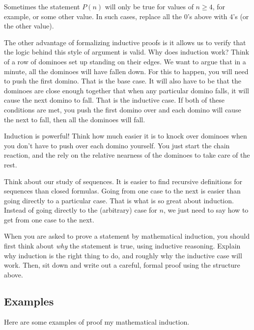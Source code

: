 \documentclass[12pt]{article}
\begin{document}
Sometimes the statement $P(n)$ will only be true for values of $n \ge 4$, for example, or some other value.  In such cases, replace all the 0's above with 4's (or the other value).

The other advantage of formalizing inductive proofs is it allows us to verify that the logic behind this style of argument is valid.  Why does induction work?  Think of a row of dominoes set up standing on their edges.  We want to argue that in a minute, all the dominoes will have fallen down.  For this to happen, you will need to push the first domino.  That is the base case.  It will also have to be that the dominoes are close enough together that when any particular domino falls, it will cause the next domino to fall.  That is the inductive case.  If both of these conditions are met, you push the first domino over and each domino will cause the next to fall, then all the dominoes will fall.

Induction is powerful!  Think how much easier it is to knock over dominoes when you don't have to push over each domino yourself.  You just start the chain reaction, and the rely on the relative nearness of the dominoes to take care of the rest.  

Think about our study of sequences.  It is easier to find recursive definitions for sequences than closed formulas.  Going from one case to the next is easier than going directly to a particular case.  That is what is so great about induction.  Instead of going directly to the (arbitrary) case for $n$, we just need to say how to get from one case to the next.  

When you are asked to prove a statement by mathematical induction, you should first think about {\em why} the statement is true, using inductive reasoning.  Explain why induction is the right thing to do, and roughly why the inductive case will work.  Then, sit down and write out a careful, formal proof using the structure above.

\subsection{Examples}

Here are some examples of proof my mathematical induction.
\end{document}
